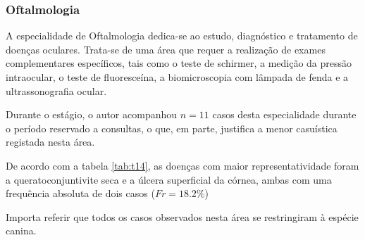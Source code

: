 \subsubsection{Oftalmologia}

A especialidade de Oftalmologia dedica-se ao estudo, diagnóstico e tratamento de doenças oculares. Trata-se de uma área que requer a realização de exames complementares específicos, tais como o teste de schirmer, a medição da pressão intraocular, o teste de fluoresceína, a biomicroscopia com lâmpada de fenda e a ultrassonografia ocular.

Durante o estágio, o autor acompanhou $n=11$ casos desta especialidade durante o período reservado a consultas, o que, em parte, justifica a menor casuística registada nesta área.

De acordo com a tabela \ref{tab:t14}, as doenças com maior representatividade foram a queratoconjuntivite seca e a úlcera superficial da córnea, ambas com uma frequência absoluta de dois casos ($Fr=18.2\%$)

Importa referir que todos os casos observados nesta área se restringiram à espécie canina.


